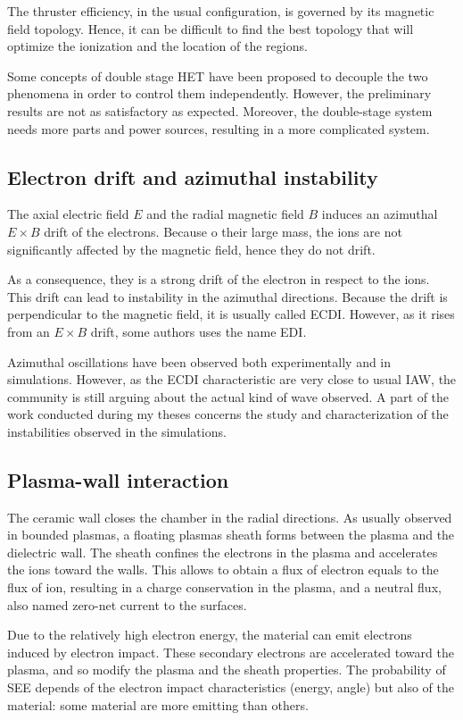 The thruster efficiency, in the usual configuration, is governed by its magnetic field topology.
Hence, it can be difficult to find the best topology that will optimize the ionization and the location of the regions.

Some concepts of double stage \ac{HET} have been proposed to decouple the two phenomena in order to control them independently.
However, the preliminary results are not as satisfactory as expected.
Moreover, the double-stage system needs more parts and power sources, resulting in a more complicated system.

\subsection{Electron drift and azimuthal instability}
The axial electric field $E$ and the radial magnetic field $B$ induces an azimuthal $E\times B$ drift of the electrons.
Because o their large mass, the ions are not significantly affected by the magnetic field, hence they do not drift.

As a consequence, they is a strong drift of the electron in respect  to the ions.
This drift can lead to instability in the azimuthal directions.
Because the drift is perpendicular to the magnetic field, it is usually called \ac{ECDI}.
However, as it rises from an $E\times B$ drift, some authors uses the name \ac{EDI}.

Azimuthal oscillations have been observed both experimentally and in simulations.
However, as the \ac{ECDI} characteristic are very close to usual \ac{IAW}, the community is still arguing about the actual kind of wave observed.
A part of the work conducted during my theses concerns the study and characterization of the instabilities observed in the simulations.

\subsection{Plasma-wall interaction}
The ceramic wall closes the chamber in the radial directions.
As usually observed in bounded plasmas, a floating plasmas sheath forms between the plasma and the dielectric wall.
The sheath confines the electrons in the plasma and accelerates the ions toward the walls.
This allows to obtain a flux of electron equals to the flux of ion, resulting in a charge conservation in the plasma, and a neutral flux, also named zero-net current to the surfaces.

Due to the relatively high electron energy, the material can emit electrons induced by electron impact.
These secondary electrons are accelerated toward the plasma, and so modify the plasma and the sheath properties.
The probability of \ac{SEE} depends of the electron impact characteristics (energy, angle) but also of the material\string: some material are more emitting than others.


